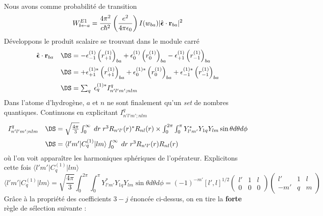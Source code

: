 \ \\

Nous avons comme probabilité de transition
\begin{equation}
W^{E1}_{b \leftarrow a} = \frac{4 \pi^2}{c \hbar^2} \left( \frac{e^2}{4 \pi \epsilon_0 } \right)
 I(w_{ba}) \vert  \hat{  \mbox{\boldmath $ \epsilon $}} \cdot 
{\bf  r}_{ba} \vert ^2
\end{equation}
Développons le produit scalaire se trouvant dans le module carré
\begin{equation}
\begin{array}{ll}
  \hat{  \mbox{\boldmath $ \epsilon $}} \cdot 
{\bf  r}_{ba}
&\DS= - \epsilon^{(1)}_{-1} \left( r^{(1)}_{+1} \right)_{ba} 
+ \epsilon^{(1)}_{0} \left(  r^{(1)}_{0} \right)_{ba}
- \epsilon^{(1)}_{+1}\left(  r^{(1)}_{-1} \right)_{ba}\vspace{2mm}\\
&\DS= +  \epsilon^{(1)\ast}_{+1}  \left( r^{(1)}_{+1} \right)_{ba} 
+  \epsilon^{(1)\ast}_{0}  \left(  r^{(1)}_{0} \right)_{ba}
+  \epsilon^{(1)\ast }_{-1}  \left(  r^{(1)}_{-1} \right)_{ba}\vspace{2mm}\\
&\DS= \sum_q \; \epsilon^{(1)\ast}_q I^q_{n'l'm';nlm}
\end{array}
\end{equation}
Dans l'atome d'hydrogène, $a$ et $n$ ne sont finalement qu'un \textit{set} de nombres quantiques.
Continuons en explicitant $I^q_{n'l'm';nlm}$
\begin{equation}
\begin{array}{ll}
I^q_{n'l'm';nlm} &\DS=  \sqrt{\frac{4 \pi}{3}} \int_0 ^\infty
\; dr \; r^3 R_{n'l'}(r)^\ast  R_{nl}(r)\times \int_0^{2 \pi} \int_0^{\pi}
Y^\ast_{l'm'} Y_{1q} Y_{lm} \sin \theta d\theta d\phi\vspace{2mm}\\
&\DS= \langle l' m' \vert C^{(1)}_q \vert l m  \rangle \int_0 ^\infty
\; dr \; r^3 R_{n'l'}(r)  R_{nl}(r)
\end{array}
\end{equation}
où l'on voit apparaître les harmoniques sphériques de l'opérateur. Explicitons cette fois 
$\langle l' m' \vert C^{(1)}_q \vert l m \rangle$
\begin{equation}
\langle l' m' \vert C^{(1)}_q \vert l m \rangle
= \sqrt{\frac{4 \pi}{3}} \int_0^{2 \pi} \int_0^{\pi}
Y^\ast_{l'm'} Y_{1q} Y_{lm} \sin \theta d\theta d\phi
= (-1)^{-m'} [l',l]^{1/2}
\left( \begin{array}{ccc} l' & 1 & l \\ 0 & 0 & 0 \end{array} \right)
\left( \begin{array}{ccc} l' & 1 & l \\ -m' & q & m \end{array} \right)
\end{equation}
Grâce à la propriété des coefficients $3-j$ énoncée ci-dessus, on en tire la \textbf{forte} 
règle de sélection suivante :\\

